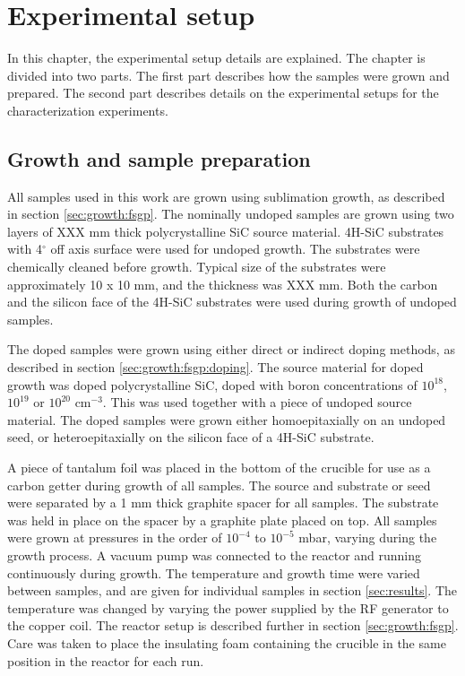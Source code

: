 
\chapter{Experimental setup}
\label{sec:experimental_details}
In this chapter, the experimental setup details are explained. The chapter is divided into two parts. The first part describes how the samples were grown and prepared. The second part describes details on the experimental setups for the characterization experiments. 

\section{Growth and sample preparation}
\label{sec:experimental:samples}
All samples used in this work are grown using sublimation growth, as described in section \ref{sec:growth:fsgp}. The nominally undoped samples are grown using two layers of XXX mm thick polycrystalline SiC source material. 4H-SiC substrates with 4$^\circ$ off axis surface were used for undoped growth. The substrates were chemically cleaned before growth. Typical size of the substrates were approximately 10 x 10 mm, and the thickness was XXX mm. Both the carbon and the silicon face of the 4H-SiC substrates were used during growth of undoped samples. 

The doped samples were grown using either direct or indirect doping methods, as described in section \ref{sec:growth:fsgp:doping}. The source material for doped growth was doped polycrystalline SiC, doped with boron concentrations of $10^{18}$, $10^{19}$ or $10^{20}$ cm$^{-3}$. This was used together with a piece of undoped source material. The doped samples were grown either homoepitaxially on an undoped seed, or heteroepitaxially on the silicon face of a 4H-SiC substrate. 

A piece of tantalum foil was placed in the bottom of the crucible for use as a carbon getter during growth of all samples. The source and substrate or seed were separated by a 1 mm thick graphite spacer for all samples. The substrate was held in place on the spacer by a graphite plate placed on top. All samples were grown at pressures in the order of $10^{-4}$ to $10^{-5}$ mbar, varying during the growth process. A vacuum pump was connected to the reactor and running continuously during growth. The temperature and growth time were varied between samples, and are given for individual samples in section \ref{sec:results}. The temperature was changed by varying the power supplied by the RF generator to the copper coil. The reactor setup is described further in section \ref{sec:growth:fsgp}. Care was taken to place the insulating foam containing the crucible in the same position in the reactor for each run. 

